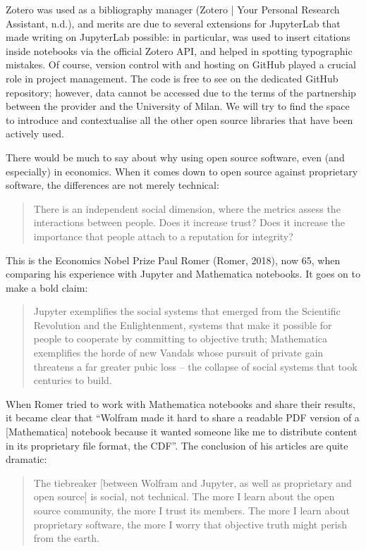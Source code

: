 \documentclass[letterpaper,10pt,english]{jupyterBook}
\begin{document}
\sphinxAtStartPar
Zotero was used as a bibliography manager (Zotero | Your Personal Research Assistant, n.d.), and merits are due to several extensions for JupyterLab that made writing on JupyterLab possible: in particular,  was used to insert citations inside notebooks via the official Zotero API, and  helped in spotting typographic mistakes. Of course, version control with  and hosting on GitHub played a crucial role in project management. The code is free to see on the dedicated GitHub repository; however, data cannot be accessed due to the terms of the partnership between the provider and the University of Milan. We will try to find the space to introduce and contextualise all the other open source libraries that have been actively used.

\sphinxAtStartPar
There would be much to say about why using open source software, even (and especially) in economics. When it comes down to open source against proprietary software, the differences are not merely technical:
\begin{quote}

\sphinxAtStartPar
There is an independent social dimension, where the metrics assess the interactions between people. Does it increase trust? Does it increase the importance that people attach to a reputation for integrity?
\end{quote}

\sphinxAtStartPar
This is the Economics Nobel Prize Paul Romer (Romer, 2018), now 65, when comparing his experience with Jupyter and Mathematica notebooks. It goes on to make a bold claim:
\begin{quote}

\sphinxAtStartPar
Jupyter exemplifies the social systems that emerged from the Scientific Revolution and the Enlightenment, systems that make it possible for people to cooperate by committing to objective truth; Mathematica exemplifies the horde of new Vandals whose pursuit of private gain threatens a far greater pubic loss – the collapse of social systems that took centuries to build.
\end{quote}

\sphinxAtStartPar
When Romer tried to work with Mathematica notebooks and share their results, it became clear that “Wolfram made it hard to share a readable PDF version of a {[}Mathematica{]} notebook because it wanted someone like me to distribute content in its proprietary file format, the CDF”. The conclusion of his articles are quite dramatic:
\begin{quote}

\sphinxAtStartPar
The tie\sphinxhyphen{}breaker {[}between Wolfram and Jupyter, as well as proprietary and open source{]} is social, not technical. The more I learn about the open source community, the more I trust its members. The more I learn about proprietary software, the more I worry that objective truth might perish from the earth.
\end{quote}
\end{document}

